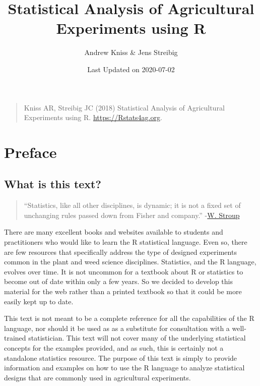 \documentclass[letterpaper,]{book}
\title{Statistical Analysis of Agricultural Experiments using R}
\author{Andrew Kniss \& Jens Streibig}
\date{Last Updated on 2020-07-02}
\begin{document}
\maketitle

{
\setcounter{tocdepth}{1}
\tableofcontents
}
\hypertarget{section}{%
\chapter*{}\label{section}}

\begin{quote}
Kniss AR, Streibig JC (2018) Statistical Analysis of Agricultural Experiments using R. \url{https://Rstats4ag.org}.
\end{quote}

\hypertarget{preface}{%
\chapter*{Preface}\label{preface}}

\hypertarget{what-is-this-text}{%
\section*{What is this text?}\label{what-is-this-text}}

\begin{quote}
``Statistics, like all other disciplines, is dynamic; it is not a fixed set of unchanging rules passed down from Fisher and company.'' -\href{https://dl.sciencesocieties.org/publications/aj/articles/107/2/811}{W. Stroup}
\end{quote}

There are many excellent books and websites available to students and practitioners who would like to learn the R statistical language. Even so, there are few resources that specifically address the type of designed experiments common in the plant and weed science disciplines. Statistics, and the R language, evolves over time. It is not uncommon for a textbook about R or statistics to become out of date within only a few years. So we decided to develop this material for the web rather than a printed textbook so that it could be more easily kept up to date.

This text is not meant to be a complete reference for all the capabilities of the R language, nor should it be used as as a substitute for consultation with a well-trained statistician. This text will not cover many of the underlying statistical concepts for the examples provided, and as such, this is certainly not a standalone statistics resource. The purpose of this text is simply to provide information and examples on how to use the R language to analyze statistical designs that are commonly used in agricultural experiments.
\end{document}

